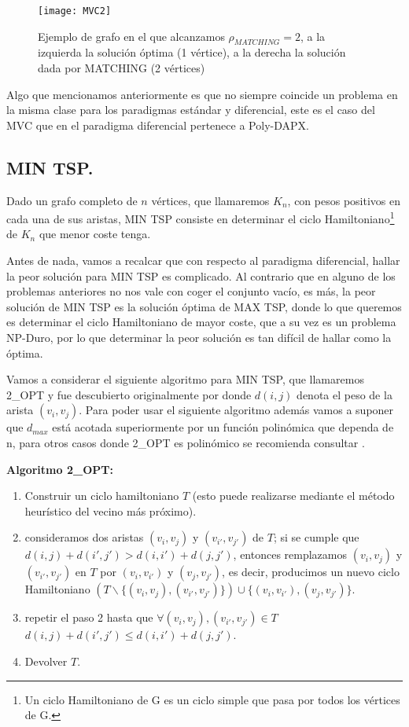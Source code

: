 \documentclass[a4paper,12pt,titlepage]{article}
\begin{document}
\begin{figure}[h]
\centering
\texttt{[image: MVC2]}
\caption{Ejemplo de grafo en el que alcanzamos $\rho_{MATCHING} = 2$, a la izquierda la soluci\'on \'optima (1 v\'ertice), a la derecha la soluci\'on dada por MATCHING (2 v\'ertices)}
\end{figure}

Algo que mencionamos anteriormente es que no siempre coincide un problema en la misma clase para los paradigmas est\'andar y diferencial, este es el caso del MVC que en el paradigma diferencial pertenece a Poly-DAPX\cite{mvc1}.

\subsection{MIN TSP.}

Dado un grafo completo de $n$ v\'ertices, que llamaremos $K_n$, con pesos positivos en cada una de sus aristas, MIN TSP consiste en determinar el ciclo Hamiltoniano\footnote{Un ciclo Hamiltoniano de G es un ciclo simple que pasa por todos los v\'ertices de G.} de $K_n$ que menor coste tenga.

Antes de nada, vamos a recalcar que con respecto al paradigma diferencial, hallar la peor soluci\'on para MIN TSP es complicado. Al contrario que en alguno de los problemas anteriores no nos vale con coger el conjunto vac\'io, es m\'as, la peor soluci\'on de MIN TSP es la soluci\'on \'optima de MAX TSP, donde lo que queremos es determinar el ciclo Hamiltoniano de mayor coste, que a su vez es un problema NP-Duro, por lo que determinar la peor soluci\'on es tan dif\'icil de hallar como la \'optima.

Vamos a considerar el siguiente algoritmo para MIN TSP, que llamaremos 2\_{OPT} y fue descubierto originalmente por \cite{TSP1} donde $d(i,j)$ denota el peso de la arista $(v_i,v_j)$.
Para poder usar el siguiente algoritmo adem\'as vamos a suponer que $d_{max}$ est\'a acotada superiormente por un funci\'on polin\'omica que dependa de n, para otros casos donde 2\_{OPT} es polin\'omico se recomienda consultar \cite{TSP2}.

\vspace{0.3cm}

\textbf{Algoritmo 2\_OPT:}

\begin{enumerate}
\item Construir un ciclo hamiltoniano $T$ (esto puede realizarse mediante el m\'etodo heur\'istico del vecino m\'as pr\'oximo).
\item consideramos dos aristas $(v_i,v_j)$ y $(v_{i'},v_{j'})$ de $T$; si se cumple que $d(i,j)+d(i',j') > d(i,i')+d(j,j')$, entonces remplazamos $(v_i,v_j)$ y $(v_{i'},v_{j'})$ en $T$ por $(v_i,v_{i'})$ y $(v_j,v_{j'})$, es decir, producimos un nuevo ciclo Hamiltoniano $(T\backslash\{(v_i,v_j),(v_{i'},v_{j'})\})\cup \{(v_i,v_{i'}),(v_j,v_{j'})\}$.
\item repetir el paso 2 hasta que $\forall (v_i,v_j), (v_{i'},v_{j'}) \in T$ $d(i,j)+d(i',j') \leq d(i,i')+d(j,j')$.
\item Devolver $T$.
\end{enumerate}
\end{document}

